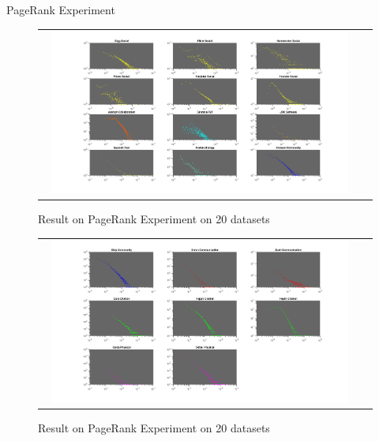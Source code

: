 PageRank Experiment

\begin{figure}[H]
\begin{center}
\begin{tabular}{cc}
     \includegraphics[width=0.95\textwidth]{FIG/pagerank1.png}
\end{tabular}
\caption{Result on PageRank Experiment on 20 datasets}
\end{center}
\end{figure}

\begin{figure}[H]
\begin{center}
\begin{tabular}{cc}
     \includegraphics[width=0.95\textwidth]{FIG/pagerank2.png}
\end{tabular}
\caption{Result on PageRank Experiment on 20 datasets}
\end{center}
\end{figure}

